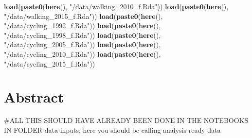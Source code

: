 \documentclass[
11pt, %
oneside, %
english, %
singlespacing, %
]{macthesis} %
\newenvironment{Shaded}{\begin{snugshade}}{\end{snugshade}}
\newcommand{\FunctionTok}[1]{\textcolor[rgb]{0.13,0.29,0.53}{\textbf{#1}}}
\newcommand{\NormalTok}[1]{#1}
\newcommand{\StringTok}[1]{\textcolor[rgb]{0.31,0.60,0.02}{#1}}
\begin{document}
\begin{Shaded}
\begin{Highlighting}[]
\FunctionTok{load}\NormalTok{(}\FunctionTok{paste0}\NormalTok{(}\FunctionTok{here}\NormalTok{(), }\StringTok{"/data/walking\_2010\_f.Rda"}\NormalTok{))}
\FunctionTok{load}\NormalTok{(}\FunctionTok{paste0}\NormalTok{(}\FunctionTok{here}\NormalTok{(), }\StringTok{"/data/walking\_2015\_f.Rda"}\NormalTok{))}
\FunctionTok{load}\NormalTok{(}\FunctionTok{paste0}\NormalTok{(}\FunctionTok{here}\NormalTok{(), }\StringTok{"/data/cycling\_1992\_f.Rda"}\NormalTok{))}
\FunctionTok{load}\NormalTok{(}\FunctionTok{paste0}\NormalTok{(}\FunctionTok{here}\NormalTok{(), }\StringTok{"/data/cycling\_1998\_f.Rda"}\NormalTok{))}
\FunctionTok{load}\NormalTok{(}\FunctionTok{paste0}\NormalTok{(}\FunctionTok{here}\NormalTok{(), }\StringTok{"/data/cycling\_2005\_f.Rda"}\NormalTok{))}
\FunctionTok{load}\NormalTok{(}\FunctionTok{paste0}\NormalTok{(}\FunctionTok{here}\NormalTok{(), }\StringTok{"/data/cycling\_2010\_f.Rda"}\NormalTok{))}
\FunctionTok{load}\NormalTok{(}\FunctionTok{paste0}\NormalTok{(}\FunctionTok{here}\NormalTok{(), }\StringTok{"/data/cycling\_2015\_f.Rda"}\NormalTok{))}
\end{Highlighting}
\end{Shaded}

\hypertarget{abstract-1}{%
\section{Abstract}\label{abstract-1}}

\#ALL THIS SHOULD HAVE ALREADY BEEN DONE IN THE NOTEBOOKS IN FOLDER data-inputs; here you should be calling analysis-ready data
\end{document}
